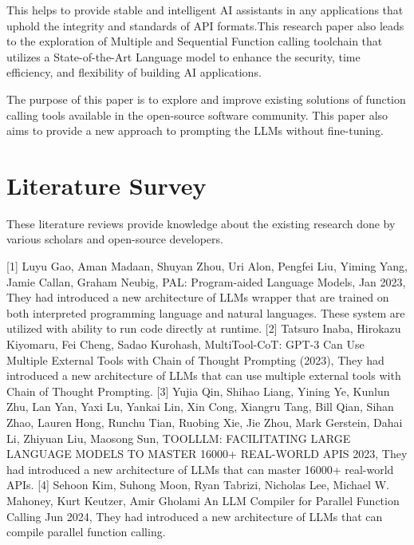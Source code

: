 \documentclass[conference]{IEEEtran}
\begin{document}
This helps to provide stable and intelligent AI assistants in any applications
that uphold the integrity and standards of API formats.This research paper also
leads to the exploration of Multiple and Sequential Function calling toolchain
that utilizes a State-of-the-Art Language model to enhance the security, time
efficiency, and flexibility of building AI applications.

The purpose of this paper is to explore and improve existing solutions of
function calling tools available in the open-source software community. This
paper also aims to provide a new approach to prompting the LLMs without
fine-tuning.

\section{Literature Survey}
These literature reviews provide knowledge about the existing research done by
various scholars and open-source developers.

    [1] Luyu Gao, Aman Madaan, Shuyan Zhou, Uri Alon, Pengfei Liu, Yiming
Yang, Jamie Callan, Graham Neubig, PAL: Program-aided
Language Models, Jan 2023, They had introduced a new architecture of LLMs wrapper that are trained on both interpreted programming language and natural languages. These system are utilized with ability to run code directly at runtime. [2] Tatsuro Inaba, Hirokazu Kiyomaru, Fei Cheng, Sadao Kurohash,
MultiTool-CoT: GPT-3 Can Use Multiple External Tools with Chain
of Thought Prompting (2023), They had introduced a new architecture of LLMs that can use multiple external tools with Chain of Thought Prompting. [3] Yujia Qin, Shihao Liang, Yining Ye, Kunlun Zhu, Lan Yan, Yaxi Lu,
Yankai Lin, Xin Cong, Xiangru Tang, Bill Qian, Sihan Zhao, Lauren
Hong, Runchu Tian, Ruobing Xie, Jie Zhou, Mark Gerstein, Dahai Li, Zhiyuan Liu, Maosong Sun, TOOLLLM: FACILITATING LARGE
LANGUAGE MODELS TO MASTER 16000+ REAL-WORLD APIS 2023, They had introduced a new architecture of LLMs that can master 16000+ real-world APIs. [4] Sehoon Kim, Suhong Moon, Ryan Tabrizi, Nicholas Lee, Michael W.
Mahoney, Kurt Keutzer, Amir Gholami An LLM Compiler
for Parallel Function Calling Jun 2024, They had introduced a new architecture of LLMs that can compile parallel function calling.
\end{document}
